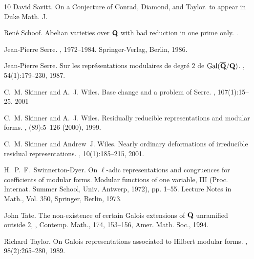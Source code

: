 \documentclass[12pt]{amsart}
\begin{document}
\begin{thebibliography}{10}
David Savitt.
\newblock On a Conjecture of Conrad, Diamond, and Taylor.
\newblock to appear in Duke Math. J.

Ren{\'e} Schoof.
\newblock Abelian varieties over {${\bf Q}$} with bad reduction in one prime
  only.
.

Jean-Pierre Serre.
, 1972--1984.
\newblock Springer-Verlag, Berlin, 1986.


Jean-Pierre Serre.
\newblock Sur les repr\'esentations modulaires de degr\'e {$2$} de {${\rm
  Gal}(\overline{\bf Q}/{\bf Q})$}.
, 54(1):179--230, 1987.


C.~M. Skinner and A.~J. Wiles.
\newblock Base change and a problem of {S}erre.
, 107(1):15--25, 2001

C.~M. Skinner and A.~J. Wiles.
\newblock Residually reducible representations and modular forms.
, (89):5--126 (2000),
  1999.

C.~M. Skinner and Andrew~J. Wiles.
\newblock Nearly ordinary deformations of irreducible residual representations.
, 10(1):185--215, 2001.

H.~P.~F.~Swinnerton-Dyer. 
\newblock On $\ell$-adic representations and congruences for coefficients of modular forms. 
\newblock Modular functions of one variable, III (Proc. Internat. Summer School, Univ. Antwerp, 1972),  pp. 1--55. Lecture Notes in Math., Vol. 350, Springer, Berlin, 1973. 

John Tate.
\newblock The non-existence of certain {G}alois extensions of {${\bf
              Q}$} unramified outside {$2$},
, Contemp. Math., 174, 153--156, Amer. Math. Soc., 1994.

Richard Taylor.
\newblock On {G}alois representations associated to {H}ilbert modular forms.
, 98(2):265--280, 1989.


\end{thebibliography}
\end{document}
